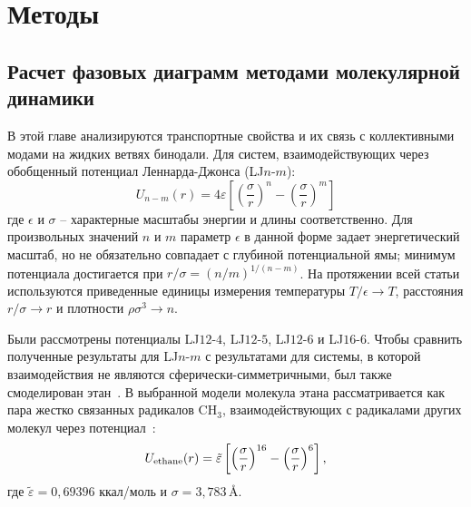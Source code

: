 \section{Методы}
\label{MACR-SecMethods}

\subsection{Расчет фазовых диаграмм методами молекулярной динамики}
\label{MACR-SubSecMD}

В этой главе анализируются транспортные свойства и их связь с коллективными модами на жидких ветвях бинодали.
Для систем, взаимодействующих через обобщенный потенциал Леннарда-Джонса (LJ$n$-$m$):
\begin{equation}
  U_{n-m}(r)=4 \varepsilon\left[\left(\frac{\sigma}{r}\right)^{n}-\left(\frac{\sigma}{r}\right)^{m}\right]
  \label{MACR-eq-lj-nm}
\end{equation}
где $\epsilon$ и $\sigma$ -- характерные масштабы энергии и длины соответственно.
Для произвольных значений $n$ и $m$ параметр $\epsilon$ в данной форме задает энергетический масштаб, но не обязательно совпадает с глубиной потенциальной ямы; минимум потенциала достигается при $r/\sigma=(n/m)^{1/(n-m)}$.
На протяжении всей статьи используются приведенные единицы измерения температуры $ T/ \epsilon \rightarrow T $, расстояния $ r/ \sigma \rightarrow r $ и плотности $ \rho \sigma ^ 3 \rightarrow n$.


Были рассмотрены потенциалы LJ$12$-$4$, LJ$12$-$5$, LJ$12$-$6$ и LJ$16$-$6$.
Чтобы сравнить полученные результаты для LJ$n$-$m$ с результатами для системы, в которой взаимодействия не являются сферически-симметричными, был также смоделирован этан~\cite{10.1021/acs.jced.6b01036}.
В выбранной модели молекула этана рассматривается как пара жестко связанных радикалов CH$_3$, взаимодействующих с радикалами других молекул через потенциал~\cite{10.1021/acs.jced.6b01036}:
\begin{equation}
  U_{\rm {ethane}}(r) = \tilde \varepsilon\left[\left(\frac{\sigma}{r}\right)^{16}-\left(\frac{\sigma}{r}\right)^{6}\right],
  \label{MACR-eq2}
\end{equation}
где $\tilde\varepsilon = 0{,}69396$ ккал/моль и $\sigma = 3{,}783$\,\AA.

